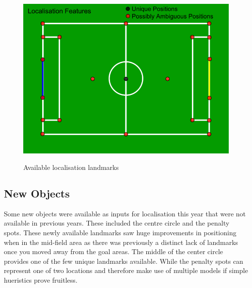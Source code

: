 \begin{figure}[htpb]
\begin{center}
   \leavevmode
    \scalebox{0.5} {\includegraphics{figs/LocalisationPoints.png} }
    \caption{Available localisation landmarks}
    \label{fig:LocalisationPoints}
\end{center}
\end{figure}

\subsection{New Objects}
Some new objects were available as inputs for localisation this year that were not available in previous years. These included the centre circle and the penalty spots. These newly available landmarks saw huge improvements in positioning when in the mid-field area as there was previously a distinct lack of landmarks once you moved away from the goal areas. The middle of the center circle provides one of the few unique landmarks available. While the penalty spots can represent one of two locations and therefore make use of multiple models if simple hueristics prove fruitless.
